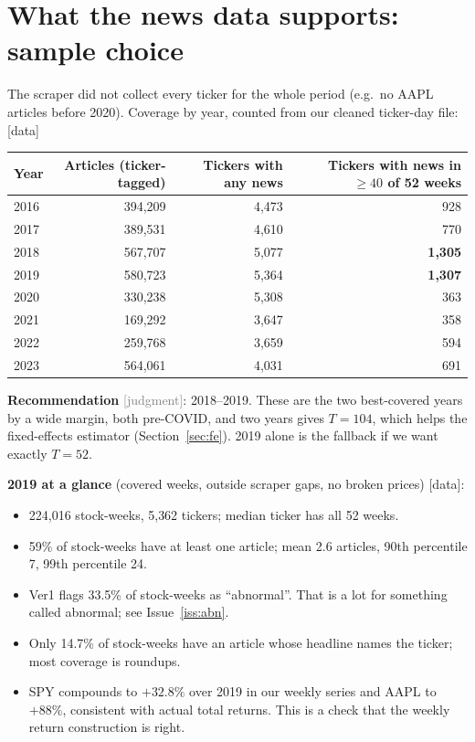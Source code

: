 \documentclass[11pt]{article}
\newcommand{\data}{\textcolor{NavyBlue}{\textsf{[data]}}}
\newcommand{\judg}{\textcolor{Gray}{\textsf{[judgment]}}}
\begin{document}
\section{What the news data supports: sample choice}\label{sec:sample}

The scraper did not collect every ticker for the whole period (e.g.\ no AAPL articles before 2020). Coverage by year, counted from our cleaned ticker-day file: \data{}

\begin{center}
\begin{tabular}{lrrr}
\toprule
Year & Articles (ticker-tagged) & Tickers with any news & Tickers with news in $\geq 40$ of 52 weeks\\
\midrule
2016 & 394{,}209 & 4{,}473 & 928\\
2017 & 389{,}531 & 4{,}610 & 770\\
2018 & 567{,}707 & 5{,}077 & \textbf{1{,}305}\\
2019 & 580{,}723 & 5{,}364 & \textbf{1{,}307}\\
2020 & 330{,}238 & 5{,}308 & 363\\
2021 & 169{,}292 & 3{,}647 & 358\\
2022 & 259{,}768 & 3{,}659 & 594\\
2023 & 564{,}061 & 4{,}031 & 691\\
\bottomrule
\end{tabular}
\end{center}

\textbf{Recommendation} \judg{}: 2018--2019. These are the two best-covered years by a wide margin, both pre-COVID, and two years gives $T=104$, which helps the fixed-effects estimator (Section~\ref{sec:fe}). 2019 alone is the fallback if we want exactly $T=52$.

\textbf{2019 at a glance} (covered weeks, outside scraper gaps, no broken prices) \data{}:
\begin{itemize}
  \item 224{,}016 stock-weeks, 5{,}362 tickers; median ticker has all 52 weeks.
  \item 59\% of stock-weeks have at least one article; mean 2.6 articles, 90th percentile 7, 99th percentile 24.
  \item Ver1 flags 33.5\% of stock-weeks as ``abnormal''. That is a lot for something called abnormal; see Issue~\ref{iss:abn}.
  \item Only 14.7\% of stock-weeks have an article whose headline names the ticker; most coverage is roundups.
  \item SPY compounds to $+32.8\%$ over 2019 in our weekly series and AAPL to $+88\%$, consistent with actual total returns. This is a check that the weekly return construction is right.
\end{itemize}
\end{document}
